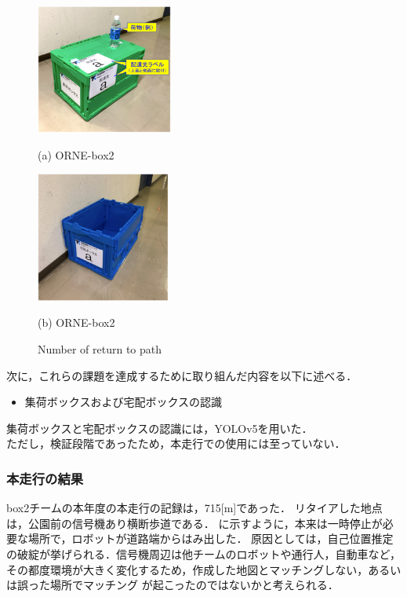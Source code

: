 \documentclass[twocolumn, 9pt]{jsproceedings}
\begin{document}
\begin{figure}[h!]
  \begin{minipage}[t]{0.47\linewidth}
    \centering
    \includegraphics[width=44.94mm]{fig/syuuka.pdf}
    \caption*{(a) ORNE-box2}
  \end{minipage}
  \hspace*{2mm}
  \begin{minipage}[t]{0.47\linewidth}
    \centering
    \includegraphics[width=44.21mm]{fig/takuhai.pdf}
    \caption*{(b) ORNE-box2}
  \end{minipage}%
  \caption{Number of return to path}
  \label{fig:hako}
\end{figure}

次に，これらの課題を達成するために取り組んだ内容を以下に述べる．

\begin{itemize}
  \setlength{\leftskip}{-1zw}
  \item 集荷ボックスおよび宅配ボックスの認識
\end{itemize}
\vspace*{-1zh}

集荷ボックスと宅配ボックスの認識には，YOLOv5を用いた．\\



ただし，検証段階であったため，本走行での使用には至っていない．







\subsubsection{本走行の結果}
box2チームの本年度の本走行の記録は，715[m]であった．
リタイアした地点は，公園前の信号機あり横断歩道である．
に示すように，本来は一時停止が必要な場所で，ロボットが道路端からはみ出した．
原因としては，自己位置推定の破綻が挙げられる．信号機周辺は他チームのロボットや通行人，自動車など，
その都度環境が大きく変化するため，作成した地図とマッチングしない，あるいは誤った場所でマッチング
が起こったのではないかと考えられる．
\end{document}
